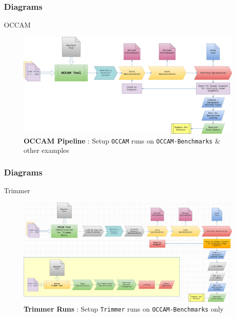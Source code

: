 \documentclass[9pt]{beamer}
\begin{document}
\begin{frame}[fragile]
	\frametitle{Diagrams}
	\begin{block}{OCCAM}
		\begin{figure}[H]
		\centering
		\includegraphics[width=1\linewidth]{imgs/occam-pipeline.png}
		\caption{\textbf{OCCAM Pipeline} : Setup \texttt{OCCAM} runs on \texttt{OCCAM-Benchmarks} \& other examples}%
		\label{fig:plant}
		\end{figure}
	\end{block}
\end{frame}
\begin{frame}[fragile]
	\frametitle{Diagrams}
	\begin{block}{Trimmer}
		\begin{figure}[H]
			\centering
		\includegraphics[width=1\linewidth]{imgs/occam-modified-trimmer.png}
		\caption{\textbf{Trimmer Runs} : Setup \texttt{Trimmer} runs on \texttt{OCCAM-Benchmarks} only}%
		\label{fig:plant}
		\end{figure}
	\end{block}
\end{frame}
\end{document}
